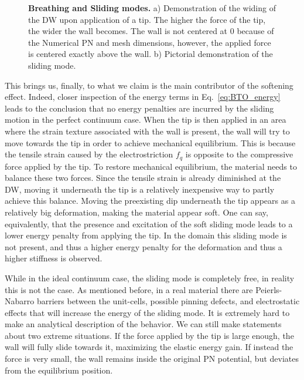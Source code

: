 \begin{figure}
	\caption{\label{fig:BTO_breathing_sliding}{\bf Breathing and Sliding modes.} a) Demonstration of the widing of the DW upon application of a tip. The higher the force of the tip, the wider the wall becomes. The wall is not centered at 0 because of the Numerical PN and mesh dimensions, however, the applied force is centered exactly above the wall. b) Pictorial demonstration of the sliding mode.}
\end{figure}

This brings us, finally, to what we claim is the main contributor of the softening effect.
Indeed, closer inspection of the energy terms in Eq.~\ref{eq:BTO_energy} leads to the conclusion that no energy penalties are incurred by the sliding motion in the perfect continuum case.
When the tip is then applied in an area where the strain texture associated with the wall is present, the wall will try to move towards the tip in order to achieve mechanical equilibrium.
This is because the tensile strain caused by the electrostriction $f_q$ is opposite to the compressive force applied by the tip.
To restore mechanical equilibrium, the material needs to balance these two forces.
Since the tensile strain is already diminished at the DW, moving it underneath the tip is a relatively inexpensive way to partly achieve this balance.
Moving the preexisting dip underneath the tip appears as a relatively big deformation, making the material appear soft.
One can say, equivalently, that the presence and excitation of the soft sliding mode leads to a lower energy penalty from applying the tip.
In the domain this sliding mode is not present, and thus a higher energy penalty for the deformation and thus a higher stiffness is observed.

While in the ideal continuum case, the sliding mode is completely free, in reality this is not the case.
As mentioned before, in a real material there are Peierls-Nabarro barriers between the unit-cells, possible pinning defects, and electrostatic effects that will increase the energy of the sliding mode.
It is extremely hard to make an analytical description of the behavior.
We can still make statements about two extreme situations.
If the force applied by the tip is large enough, the wall will fully slide towards it, maximizing the elastic energy gain.
If instead the force is very small, the wall remains inside the original PN potential, but deviates from the equilibrium position.

